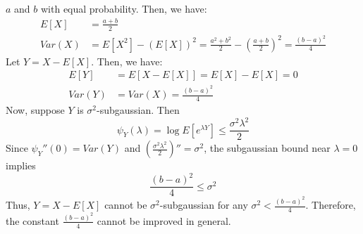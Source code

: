 \documentclass[11pt,a4paper,margin=1in]{article}
\begin{document}
\begin{enumerate}[(a)]
    $a$ and $b$ with equal probability. Then, we have:
    \begin{align*}
        E[X] &= \frac{a+b}{2} \\
        Var(X) &= E[X^2] - (E[X])^2 = \frac{a^2 + b^2}{2} - \left( \frac{a+b}{2} \right)^2 = \frac{(b-a)^2}{4}
    \end{align*}
    Let $Y = X - E[X]$. Then, we have:
    \begin{align*}
        E[Y] &= E[X - E[X]] = E[X] - E[X] = 0 \\
        Var(Y) &= Var(X) = \frac{(b-a)^2}{4}
    \end{align*}
    Now, suppose $Y$ is $\sigma^2$-subgaussian. Then
    \[
        \psi_Y(\lambda) = \log E[e^{\lambda Y}] \leq \frac{\sigma^2 \lambda^2}{2}
    \]
    Since $\psi_Y''(0) = Var(Y)$ and $\left( \frac{\sigma^2 \lambda^2}{2} \right)'' = \sigma^2$, 
    the subgaussian bound near $\lambda = 0$ implies 
    \[
        \frac{(b-a)^2}{4} \leq \sigma^2
    \]
    Thus, $Y = X - E[X]$ cannot be $\sigma^2$-subgaussian for any $\sigma^2 < \frac{(b-a)^2}{4}$. 
    Therefore, the constant $\frac{(b-a)^2}{4}$ cannot be improved in general.
\end{enumerate}
\end{document}
